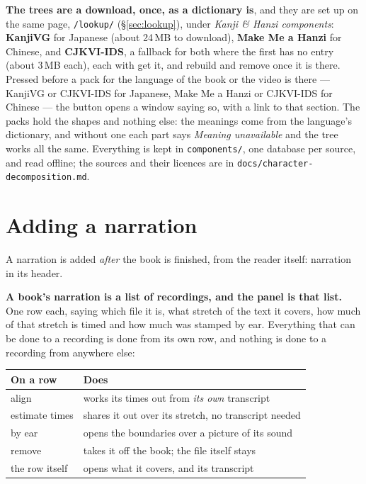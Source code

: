 \documentclass[11pt,oneside]{report}
\newcommand{\file}[1]{\texttt{#1}}
\newcommand{\menu}[1]{\textsf{#1}}
\begin{document}
\textbf{The trees are a download, once, as a dictionary is}, and they are set
up on the same page, \texttt{/lookup/} (\S\ref{sec:lookup}), under \emph{Kanji
\& Hanzi components}: \textbf{KanjiVG} for Japanese (about 24\,MB to
download), \textbf{Make Me a Hanzi} for Chinese, and \textbf{CJKVI-IDS}, a
fallback for both where the first has no entry (about 3\,MB each), each with
\menu{get it}, and \menu{rebuild} and \menu{remove} once it is there. Pressed
before a pack for the language of the book or the video is there --- KanjiVG
or CJKVI-IDS for Japanese, Make Me a Hanzi or CJKVI-IDS for Chinese --- the
button opens a window saying so, with a link to that section. The packs hold the shapes and nothing else: the
meanings come from the language's dictionary, and without one each part says
\emph{Meaning unavailable} and the tree works all the same. Everything is kept
in \file{components/}, one database per source, and read offline; the
sources and their licences are in \file{docs/character-decomposition.md}.

\section{Adding a narration}
\label{sec:audio}

A narration is added \emph{after} the book is finished, from the reader
itself: \menu{narration} in its header.

\textbf{A book's narration is a list of recordings, and the panel is that
list.} One row each, saying which file it is, what stretch of the text it
covers, how much of that stretch is timed and how much was stamped by ear.
Everything that can be done to a recording is done from its own row, and
nothing is done to a recording from anywhere else:

\begin{center}
\begin{tabular}{@{}ll@{}}
\toprule
\textsf{On a row} & \textsf{Does} \\
\midrule
\menu{align} & works its times out from \emph{its own} transcript \\
\menu{estimate times} & shares it out over its stretch, no transcript needed \\
\menu{by ear} & opens the boundaries over a picture of its sound \\
\menu{remove} & takes it off the book; the file itself stays \\
the row itself & opens what it covers, and its transcript \\
\bottomrule
\end{tabular}
\end{center}
\end{document}
